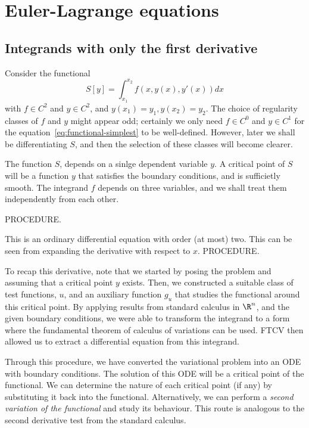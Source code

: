 \section{Euler-Lagrange equations}

\subsection{Integrands with only the first derivative}
Consider the functional
\begin{equation}
    S[y] = \int_{x_1}^{x_2} f(x, y(x), y'(x)) dx
    \label{eq:functional-simplest}
\end{equation}
with $f \in C^2$ and $y \in C^2$, and $y(x_1)=y_1, y(x_2)=y_2$. The choice of regularity classes of $f$ and $y$ might appear odd; certainly we only need $f \in C^{0}$ and $y \in C^{1}$ for the equation~\eqref{eq:functional-simplest} to be well-defined. However, later we shall be differentiating $S$, and then the selection of these classes will become clearer.

The function $S$, depends on a sinlge dependent variable $y$. A critical point of $S$ will be a function $y$ that satisfies the boundary conditions, and is sufficietly smooth. The integrand $f$ depends on three variables, and we shall treat them independently from each other.

PROCEDURE.

This is an ordinary differential equation with order (at most) two. This can be seen from expanding the derivative with respect to $x$. PROCEDURE.

To recap this derivative, note that we started by posing the problem and assuming that a critical point $y$ exists. Then, we constructed a suitable class of test functions, $u$, and an auxiliary function $g_u$ that studies the functional around this critical point. By applying results from standard calculus in $\R^n$, and the given boundary conditions, we were able to transform the integrand to a form where the fundamental theorem of calculus of variations can be used. FTCV then allowed us to extract a differential equation from this integrand.

Through this procedure, we have converted the variational problem into an ODE with boundary conditions. The solution of this ODE will be a critical point of the functional. We can determine the nature of each critical point (if any) by substituting it back into the functional. Alternatively, we can perform a \emph{second variation of the functional} and study its behaviour. This route is analogous to the second derivative test from the standard calculus.

